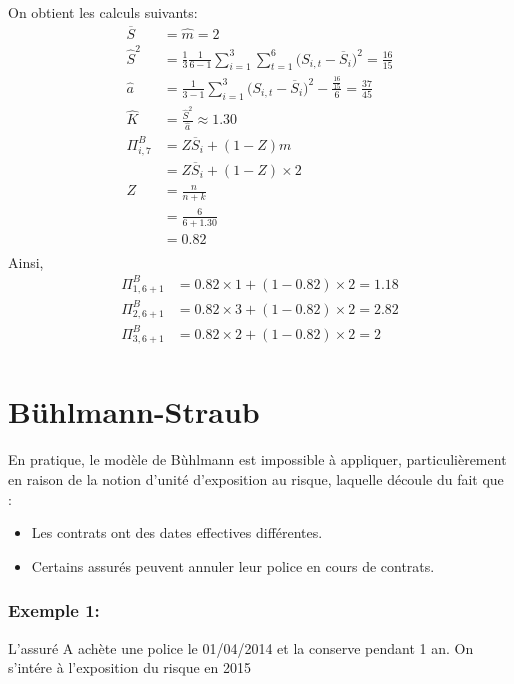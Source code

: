 \documentclass[11pt,french]{report}
\begin{document}
\bigskip
On obtient les calculs suivants:
\begin{align*}
\overline{S} &= \widehat{m} = 2 \\
\widehat{S}^2 &= \frac{1}{3} \frac{1}{6-1} \sum_{i=1}^{3} \sum_{t=1}^{6} \Big(S_{i,t} - \overline{S}_i \Big)^2 = \frac{16}{15} \\
\widehat{a} &= \frac{1}{3-1} \sum_{i=1}^{3} \Big(S_{i,t} - \overline{S}_i \Big)^2 - \frac{\frac{16}{15}}{6}= \frac{37}{45} \\
\widehat{K} &= \frac{\widehat{S}^2}{\widehat{a}} \approx 1.30 \\
\Pi_{i,7}^{B} &= Z \overline{S}_i + (1 - Z) m \\
&= Z \overline{S}_i + (1 - Z) \times 2 \\
Z &= \frac{n}{n +k} \\
&= \frac{6}{6 + 1.30} \\
&= 0.82\\
\end{align*}
Ainsi,
\begin{align*}
\Pi_{1,6+1}^{B} &= 0.82 \times 1 + (1 - 0.82) \times 2 = 1.18 \\
\Pi_{2,6+1}^{B} &= 0.82 \times 3 + (1 - 0.82) \times 2 = 2.82 \\
\Pi_{3,6+1}^{B} &= 0.82 \times 2 + (1 - 0.82) \times 2 = 2 \\
\end{align*}

\chapter{Bühlmann-Straub}
En pratique, le modèle de Bùhlmann est impossible à appliquer, particulièrement en raison de la notion d'unité d'exposition au risque, laquelle découle du fait que :
\begin{itemize}
\item Les contrats ont des dates effectives différentes.
\item Certains assurés peuvent annuler leur police en cours de contrats.
\end{itemize}

\subsection*{Exemple 1:}
L'assuré A achète une police le 01/04/2014 et la conserve pendant 1 an. On s'intére à l'exposition du risque en 2015 
\end{document}
